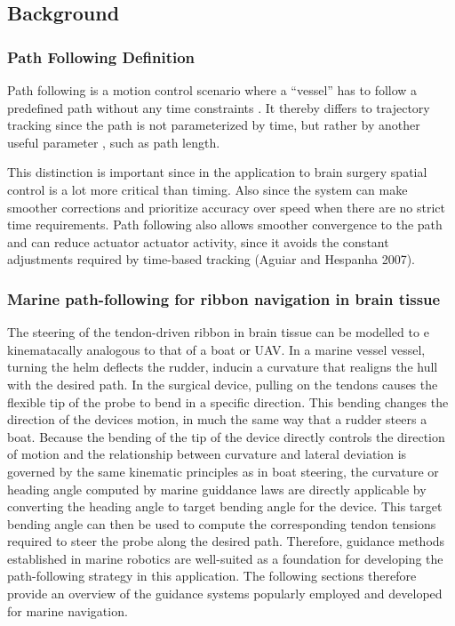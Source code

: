 
\subsection{Background}
\subsubsection{Path Following Definition}
Path following is a  motion control scenario where a “vessel” has to follow a predefined path without any time constraints \cite{caharija_integral_2016}. It thereby differs to trajectory tracking since the path is not parameterized by time, but rather by another useful parameter \cite{hung_review_2023}, such as path length. 

This distinction is important since in the application to brain surgery spatial control is a lot more critical than timing. Also since the system can make smoother corrections and prioritize accuracy over speed when there are no strict time requirements. Path following also allows smoother convergence to the path and can reduce actuator actuator activity, since it avoids the constant adjustments required by time-based tracking (Aguiar and Hespanha 2007).

\subsubsection{Marine path-following for ribbon navigation in brain tissue}
The steering of the tendon-driven ribbon in brain tissue can be modelled to e kinematacally analogous to that of a boat or UAV. In a marine vessel vessel, turning the helm deflects the rudder, inducin a curvature that realigns the hull with the desired path. In the surgical device, pulling on the tendons causes the flexible tip of the probe to bend in a specific direction. This bending changes the direction of the devices motion, in much the same way that a rudder steers a boat. 
\newline \newline 
Because the bending of the tip of the device directly controls the direction of motion and the relationship between curvature and lateral deviation is governed by the same kinematic principles as in boat steering, the curvature or heading angle computed by marine guiddance laws are directly applicable by converting the heading angle to target bending angle for the device. This target bending angle can then be used to compute the corresponding tendon tensions required to steer the probe along the desired path.
\newline \newline 
Therefore, guidance methods established in marine robotics are well-suited as a foundation for developing the path-following strategy in this application. The following sections therefore provide an overview of the guidance systems popularly employed and developed for marine navigation.

